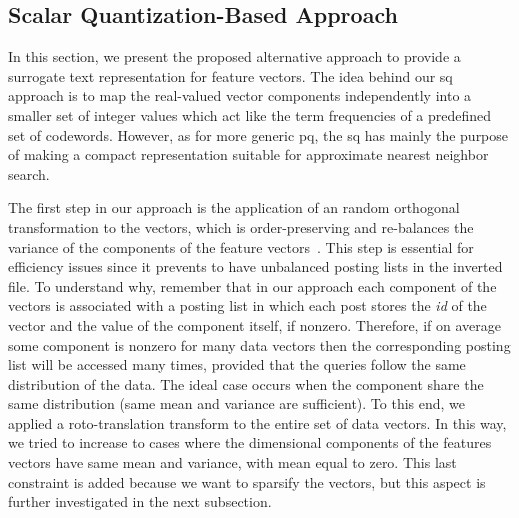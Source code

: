\subsection{Scalar Quantization-Based Approach}
\label{subsec:str:sq}
In this section, we present the proposed alternative approach to provide a surrogate text representation for feature vectors.
The idea behind our \gls{sq} approach is to map the real-valued vector components independently into a smaller set of integer values which act like the term frequencies of a predefined set of codewords.
However, as for more generic \gls{pq}, the \gls{sq} has mainly the purpose of making a compact representation suitable for approximate nearest neighbor search.

The first step in our approach is the application of an random orthogonal transformation to the vectors, which is order-preserving and re-balances the variance of the components of the feature vectors~\cite{jegou2010aggregating}.
This step is essential for efficiency issues since it prevents to have unbalanced posting lists in the inverted file.
To understand why, remember that in our approach each component of the vectors is associated with a posting list in which each post stores the \emph{id} of the vector and the value of the component itself, if nonzero.
Therefore, if on average some component is nonzero for many data vectors then the corresponding posting list will be accessed many times, provided that the queries follow the same distribution of the data.
The ideal case occurs when the component share the same distribution (same mean and variance are sufficient).
To this end, we applied a roto-translation transform to the entire set of data vectors.
In this way, we tried to increase to cases where the dimensional components of the features vectors have same mean and variance, with mean equal to zero.
This last constraint is added because we want to sparsify the vectors, but this aspect is further investigated in the next subsection.

